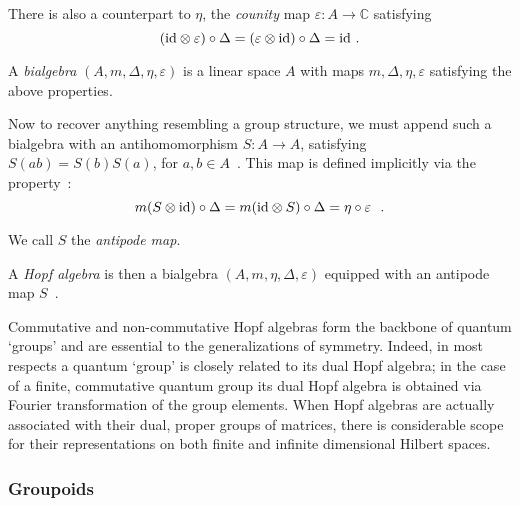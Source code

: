 \documentclass[12pt]{article}
\theoremstyle{plain}
\theoremstyle{definition}
\numberwithin{equation}{section}
\newcommand{\ID}{{\rm id}}
\newcommand{\bC}{\mathbb{C}}
\newcommand{\vep}{\varepsilon}
\newcommand{\lra}{{\longrightarrow}}
\newcommand{\<}{{\langle}}
\begin{document}
 There is also a counterpart to $\eta$, the \emph{counity} map
$\vep : A \lra \bC$ satisfying
\begin{equation}
(\ID \otimes \vep) \circ \Delta = (\vep \otimes \ID) \circ \Delta
= \ID~.
\end{equation}
  
 A \emph{bialgebra} $(A, m, \Delta, \eta,\vep)$ is a linear space $A$ with maps $m, \Delta, \eta, \vep$
satisfying the above properties.

  Now to recover anything resembling a group structure, we must
append such a bialgebra with an antihomomorphism $S : A \lra A$,
satisfying $S(ab) = S(b) S(a)$, for $a,b \in A$~. This map is
defined implicitly via the property~:
\begin{equation} m(S \otimes
\ID) \circ \Delta = m(\ID \otimes S) \circ \Delta = \eta \circ
\vep~~.
\end{equation}

 We call $S$ the \emph{antipode map}. 

 A \emph{Hopf algebra} is then a bialgebra $(A,m, \eta, \Delta, \vep)$ equipped with an antipode
map $S$~.

 Commutative and non-commutative Hopf algebras form the backbone of
quantum `groups' and are essential to the generalizations of
symmetry. Indeed, in most respects a quantum `group' is closely related to its dual
Hopf algebra; in the case of a finite, commutative quantum group its dual Hopf algebra is 
obtained via Fourier transformation of the group elements.  When Hopf algebras are actually associated with their dual, proper groups of matrices, there is considerable scope for their representations on both finite and infinite dimensional Hilbert spaces.


\subsubsection{Groupoids}
\end{document}
